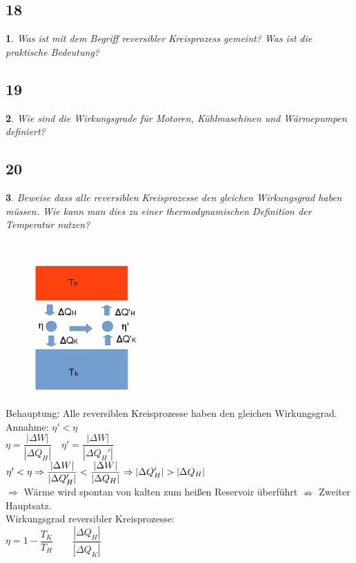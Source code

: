 \documentclass[12pt,a4paper]{report}
\newtheorem{myfrag}{}%
\begin{document}
\subsection{18}
\begin{myfrag}
Was ist mit dem Begriff reversibler Kreisprozess gemeint? Was ist die praktische
Bedeutung?
\end{myfrag}
\subsection{19}
\begin{myfrag}
Wie sind die Wirkungsgrade für Motoren, Kühlmaschinen und Wärmepumpen
definiert?
\end{myfrag}
\subsection{20}

\begin{myfrag}

Beweise dass alle reversiblen Kreisprozesse den gleichen Wirkungsgrad haben
müssen. Wie kann man dies zu einer thermodynamischen Definition der
Temperatur nutzen?
\end{myfrag} \quad \\
\begin{figure}
\vspace{-35mm}
\includegraphics[width=4cm]{Bilder/Frage20.jpg} 

\end{figure}
Behauptung: Alle reversiblen Kreisprozesse haben den gleichen Wirkungsgrad.\\[2ex]
Annahme: $\eta' <\eta$ \\[2ex]
$\eta = \dfrac{|\Delta W|}{|\Delta Q_H |} \quad \eta' = \dfrac{|\Delta W|}{|\Delta Q_H' |}$ \\
$\eta' < \eta \Rightarrow \dfrac{|\Delta W|}{|\Delta Q_H' |} < \dfrac{|\Delta W|}{|\Delta Q_H |} \\ \Rightarrow | \Delta Q_H'| > | \Delta Q_H | $ \\
$\Rightarrow $ Wärme wird spontan von kalten zum heißen Reservoir überführt $\nRightarrow$ Zweiter Hauptsatz. \\[2ex]
Wirkungsgrad reversibler Kreisprozesse: \\
$\eta = 1 - \dfrac{T_K}{T_H} \qquad \dfrac{|\Delta Q_H|}{|\Delta Q_K|}$
 
\end{document}
